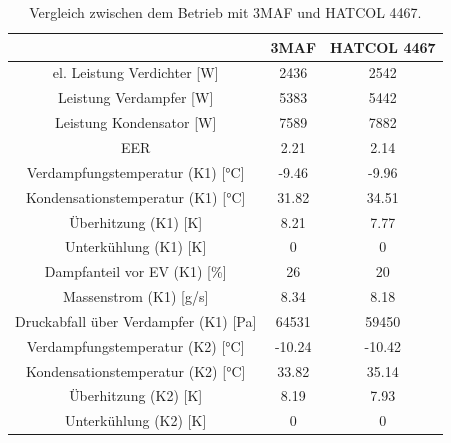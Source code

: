 \begin{table}[h!]
\centering
\caption{Vergleich zwischen dem Betrieb mit 3MAF und HATCOL 4467.}
\label{tab:VergleichKMOele}
\begin{tabular}{|ccc|}
\hline

                                                                & 3MAF                        & HATCOL 4467 \\ \hline
\multicolumn{1}{|c|}{el. Leistung Verdichter {[}W{]}}           & \multicolumn{1}{c|}{2436}   & 2542        \\
\multicolumn{1}{|c|}{Leistung Verdampfer {[}W{]}}               & \multicolumn{1}{c|}{5383}   & 5442        \\
\multicolumn{1}{|c|}{Leistung Kondensator {[}W{]}}             & \multicolumn{1}{c|}{7589}   & 7882        \\
\multicolumn{1}{|c|}{EER}                                       & \multicolumn{1}{c|}{2.21}   & 2.14        \\ \hline
\multicolumn{1}{|c|}{Verdampfungstemperatur (K1) {[}°C{]}}      & \multicolumn{1}{c|}{-9.46}  & -9.96       \\
\multicolumn{1}{|c|}{Kondensationstemperatur (K1) {[}°C{]}}    & \multicolumn{1}{c|}{31.82}  & 34.51       \\
\multicolumn{1}{|c|}{Überhitzung (K1) {[}K{]}}                  & \multicolumn{1}{c|}{8.21}   & 7.77        \\
\multicolumn{1}{|c|}{Unterkühlung (K1) {[}K{]}}                 & \multicolumn{1}{c|}{0}      & 0           \\
\multicolumn{1}{|c|}{Dampfanteil vor EV (K1) {[}\%{]}}          & \multicolumn{1}{c|}{26}     & 20          \\
\multicolumn{1}{|c|}{Massenstrom (K1) {[}g/s{]}}                & \multicolumn{1}{c|}{8.34}   & 8.18        \\
\multicolumn{1}{|c|}{Druckabfall über Verdampfer (K1) {[}Pa{]}} & \multicolumn{1}{c|}{64531}  & 59450       \\ \hline
\multicolumn{1}{|c|}{Verdampfungstemperatur (K2) {[}°C{]}}      & \multicolumn{1}{c|}{-10.24} & -10.42      \\
\multicolumn{1}{|c|}{Kondensationstemperatur (K2) {[}°C{]}}    & \multicolumn{1}{c|}{33.82}  & 35.14       \\
\multicolumn{1}{|c|}{Überhitzung (K2) {[}K{]}}                  & \multicolumn{1}{c|}{8.19}   & 7.93        \\
\multicolumn{1}{|c|}{Unterkühlung (K2) {[}K{]}}                 & \multicolumn{1}{c|}{0}      & 0           \\

\end{tabular}
\end{table}
